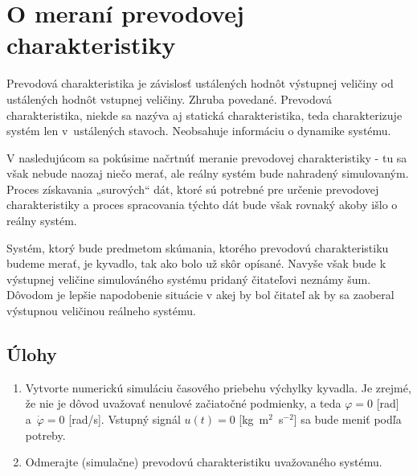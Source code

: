 \documentclass[a4paper, 10pt, ]{article}
\begin{document}
\section{O meraní prevodovej charakteristiky}


\noindent
Prevodová charakteristika je závislosť ustálených hodnôt výstupnej veličiny od ustálených hodnôt vstupnej veličiny. Zhruba povedané. Prevodová charakteristika, niekde sa nazýva aj statická charakteristika, teda charakterizuje systém len v~ustálených stavoch. Neobsahuje informáciu o dynamike systému.


V nasledujúcom sa pokúsime načrtnúť meranie prevodovej charakteristiky - tu sa však nebude naozaj niečo merať, ale reálny systém bude nahradený simulovaným. Proces získavania „surových“ dát, ktoré sú potrebné pre určenie prevodovej charakteristiky a proces spracovania týchto dát bude však rovnaký akoby išlo o reálny systém.

Systém, ktorý bude predmetom skúmania, ktorého prevodovú charakteristiku budeme merať, je kyvadlo, tak ako bolo už skôr opísané. Navyše však bude k výstupnej veličine simulováného systému pridaný čitateľovi neznámy šum. Dôvodom je lepšie napodobenie situácie v akej by bol čitateľ ak by sa zaoberal výstupnou veličinou reálneho systému.


















\subsection{Úlohy}

\begin{enumerate}

	\item Vytvorte numerickú simuláciu časového priebehu výchylky kyvadla. Je zrejmé, že nie je dôvod uvažovať nenulové začiatočné podmienky, a teda $\varphi = 0$ [rad] a~$\dot\varphi = 0$ [rad/s]. Vstupný signál $u(t) = 0$ [kg~m$^2$~s$^{-2}$] sa bude meniť podľa potreby.


    \item Odmerajte (simulačne) prevodovú charakteristiku uvažovaného systému.

\end{enumerate}
\end{document}
